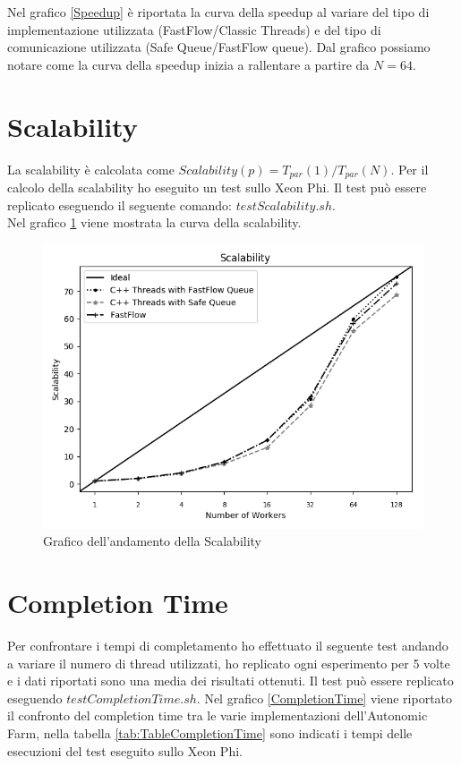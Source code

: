 \documentclass[12pt]{report}
\begin{document}
Nel grafico \ref{Speedup} è riportata la curva della speedup al variare del tipo di implementazione utilizzata (FastFlow/Classic Threads) e del tipo di comunicazione utilizzata (Safe Queue/FastFlow queue).
Dal grafico possiamo notare come la curva della speedup inizia a rallentare a partire da $N=64$.

\section{Scalability}

La scalability è calcolata come $Scalability(p)=T_{par}(1)/T_{par}(N)$.
Per il calcolo della scalability ho eseguito un test sullo Xeon Phi.
Il test può essere replicato eseguendo il seguente comando:
$testScalability.sh$.\\Nel grafico \ref{Scalability} viene mostrata la curva della scalability.

\begin{figure}[H]
    \centering
    \includegraphics[width=0.65\linewidth]{Scalability.png}
    \caption{Grafico dell'andamento della Scalability}
    \label{Scalability}
  \end{figure}


\section{Completion Time}

Per confrontare i tempi di completamento ho effettuato il seguente test andando a variare il numero di thread utilizzati, ho replicato ogni esperimento per 5 volte e i dati riportati sono una media dei risultati ottenuti.
Il test può essere replicato eseguendo $testCompletionTime.sh$.
Nel grafico \ref{CompletionTime} viene riportato il confronto del completion time tra le varie implementazioni dell'Autonomic Farm, nella tabella \ref{tab:TableCompletionTime} sono indicati i tempi delle esecuzioni del test eseguito sullo Xeon Phi.
\end{document}
